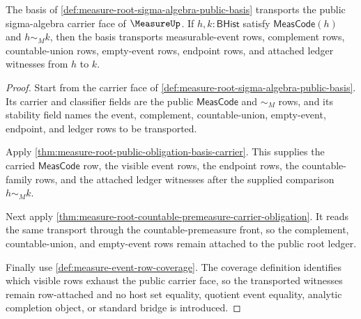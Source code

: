 \begin{theorem}
\label{thm:measure-root-sigma-algebra-public-carrier}
The basis of \autoref{def:measure-root-sigma-algebra-public-basis}
transports the public sigma-algebra carrier face of $\MeasureUp$. If
$h,k:\mathsf{BHist}$ satisfy $\mathsf{MeasCode}(h)$ and $h\sim_M k$, then
the basis transports measurable-event rows, complement rows,
countable-union rows, empty-event rows, endpoint rows, and attached ledger
witnesses from $h$ to $k$.
\end{theorem}
\begin{proof}
Start from the carrier face of
\autoref{def:measure-root-sigma-algebra-public-basis}. Its carrier and
classifier fields are the public $\mathsf{MeasCode}$ and $\sim_M$ rows, and
its stability field names the event, complement, countable-union,
empty-event, endpoint, and ledger rows to be transported.

Apply \autoref{thm:measure-root-public-obligation-basis-carrier}. This
supplies the carried $\mathsf{MeasCode}$ row, the visible event rows, the
endpoint rows, the countable-family rows, and the attached ledger witnesses
after the supplied comparison $h\sim_M k$.

Next apply \autoref{thm:measure-root-countable-premeasure-carrier-obligation}.
It reads the same transport through the countable-premeasure front, so the
complement, countable-union, and empty-event rows remain attached to the
public root ledger.

Finally use \autoref{def:measure-event-row-coverage}. The coverage
definition identifies which visible rows exhaust the public carrier face, so
the transported witnesses remain row-attached and no host set equality,
quotient event equality, analytic completion object, or standard bridge is
introduced.
\end{proof}

